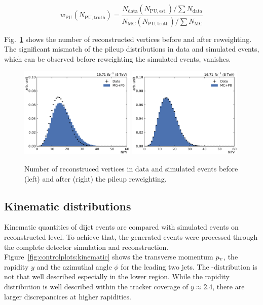 \begin{equation*}
    w_{\mathrm{PU}} (N_{\mathrm{PU, truth}}) = \frac{N_\mathrm{data}
    (N_\mathrm{PU, est.}) / \sum N_\mathrm{data}}{N_\mathrm{MC}
    (N_\mathrm{PU, truth}) / \sum N_\mathrm{MC}}
\end{equation*}

Fig.~\ref{fig:mc:npv_reweighting} shows the number of reconstructed vertices
before and after reweighting. The significant mismatch of the
pileup distributions in data and simulated events, which can be observed before
reweighting the simulated events, vanishes.

\begin{figure}[htbp]
    \centering
    \includegraphics[width=0.49\textwidth]{figures/measurement/npv_beforereweighting.pdf}\hfill
    \includegraphics[width=0.49\textwidth]{figures/measurement/npv_afterreweighting.pdf}
    \caption[Number of reconstructed vertices]{Number of reconstruced vertices in data and simulated events before
    (left) and after (right) the pileup reweighting.}
    \label{fig:mc:npv_reweighting}
\end{figure}

\subsection{Kinematic distributions}

Kinematic quantities of dijet events are compared with simulated events on
reconstructed level. To achieve that, the generated events were processed
through the complete detector simulation and reconstruction.
Figure~\ref{fig:controlplots:kinematic} shows the transverse momentum $\pt$, the
rapidity $y$ and the azimuthal angle $\phi$ for the leading two jets. The
\pt-distribution is not that well described especially in the lower \pt region.
While the rapidity distribution is well described within the tracker coverage of
$y \approx 2.4$, there are larger discrepancices at higher rapidities.

